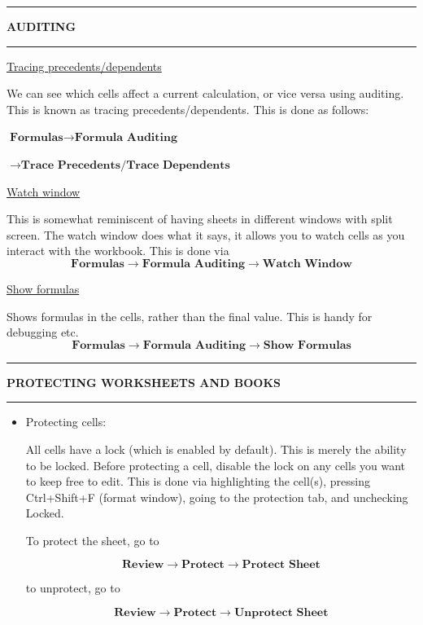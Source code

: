 \documentclass[8pt]{extarticle}
\newcommand{\heading}[1]{%
    \noindent
    \rule{\linewidth}{0.4pt}
    \begin{center}
        \vspace{-1ex}
        \textbf{#1}        
        \vspace{-2.5ex}
    \end{center}
    \rule{\linewidth}{0.4pt}
}
\begin{document}
\begin{multicols}{3}
\heading{AUDITING}

\begin{center}
    \underline{Tracing precedents/dependents}
\end{center}

We can see which cells affect a current calculation, or vice versa using auditing. This is known as tracing precedents/dependents. This is done as follows:
\begin{center}
$\textbf{Formulas} \rightarrow \textbf{Formula Auditing} $

$\rightarrow \textbf{Trace Precedents/Trace Dependents}$
\end{center}

\begin{center}
    \underline{Watch window}
\end{center}

This is somewhat reminiscent of having sheets in different windows with split screen. The watch window does what it says, it allows you to watch cells as you interact with the workbook. This is done via
\[\textbf{Formulas} \rightarrow \textbf{Formula Auditing} \rightarrow \textbf{Watch Window}\]

\begin{center}
    \underline{Show formulas}
\end{center}

Shows formulas in the cells, rather than the final value. This is handy for debugging etc.
\[\textbf{Formulas} \rightarrow \textbf{Formula Auditing} \rightarrow \textbf{Show Formulas}\]

\heading{PROTECTING WORKSHEETS AND BOOKS}

\begin{itemize}
    \item Protecting cells:

    All cells have a lock (which is enabled by default). This is merely the ability to be locked. Before protecting a cell, disable the lock on any cells you want to keep free to edit. This is done via highlighting the cell(s), pressing Ctrl+Shift+F (format window), going to the protection tab, and unchecking Locked. 

    To protect the sheet, go to 

    \[\textbf{Review} \rightarrow \textbf{Protect} \rightarrow \textbf{Protect Sheet}\]

    to unprotect, go to 
    
    \[\textbf{Review} \rightarrow \textbf{Protect} \rightarrow \textbf{Unprotect Sheet}\]


\end{itemize}
\end{multicols}
\end{document}
